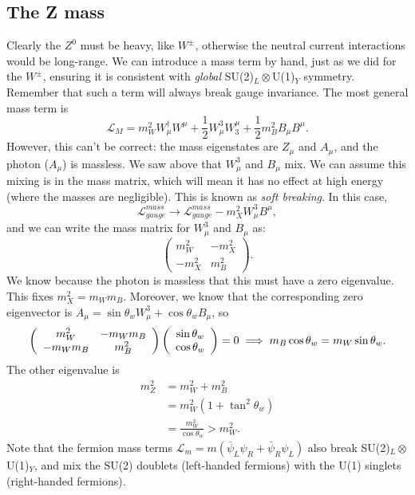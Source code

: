 \documentclass[a4paper,12pt]{article}
\begin{document}
\subsection{The Z mass}
%
Clearly the $Z^0$ must be heavy, like $W^\pm$, otherwise the neutral current interactions would be long-range. We can introduce a mass term by hand, just as we did for the $W^\pm$, ensuring it is consistent with \textit{global} SU(2)$_L \otimes$U(1)$_Y$ symmetry. Remember that such a term will always break gauge invariance. The most general mass term is
\begin{equation}
\mathcal{L}_M  = m_W^2 W_\mu^\dagger W^\mu + \frac{1}{2} W_\mu^3 W_3^\mu + \frac{1}{2}m_B^2 B_\mu B^\mu.
\end{equation}
However, this can't be correct: the mass eigenstates are $Z_\mu$ and $A_\mu$, and the photon ($A_\mu$) is massless. We saw above that $W_\mu^3$ and $B_\mu$ mix. We can assume this mixing is in the mass matrix, which will mean it has no effect at high energy (where the masses are negligible). This is known as \textit{soft breaking}. In this case,
\begin{equation}
\mathcal{L}_{gauge}^{mass} \to \mathcal{L}_{gauge}^{mass} - m_X^2W_\mu^3 B^\mu,
\end{equation}
and we can write the mass matrix for $W_\mu^3$ and $B_\mu$ as:
\[ \left( \begin{array}{cc}
m_W^2 & -m_X^2  \\
-m_X^2 & m_B^2  \end{array} \right).  \]
We know because the photon is massless that this must have a zero eigenvalue. This fixes $m_X^2 = m_W m_B$. Moreover, we know that the corresponding zero eigenvector is
$A_\mu = \sin\theta_w W_\mu^3 + \cos\theta_w B_\mu$, so 
\[ \left( \begin{array}{cc}
m_W^2 & -m_Wm_B  \\
-m_Wm_B & m_B^2  \end{array} \right)
\left( \begin{array}{cc}
\sin\theta_w \\
\cos\theta_w \end{array} \right) = 0 \\
\implies m_B\cos\theta_w = m_W\sin\theta_w. \]
The other eigenvalue is 
\begin{equation}
\begin{split}
m_Z^2 &= m_W^2 + m_B^2 \\
&= m_W^2(1+ \tan^2\theta_w) \\
&= \frac{m_W^2}{\cos\theta_w} > m_W^2.
\end{split}
\end{equation}
Note that the fermion mass terms $\mathcal{L}_m = m(\bar{\psi}_L\psi_R + \bar{\psi}_R \psi_L)$ also break SU(2)$_L \otimes$U(1)$_Y$, and mix the SU(2) doublets (left-handed fermions) with the U(1) singlets (right-handed fermions). 
%
\end{document}
